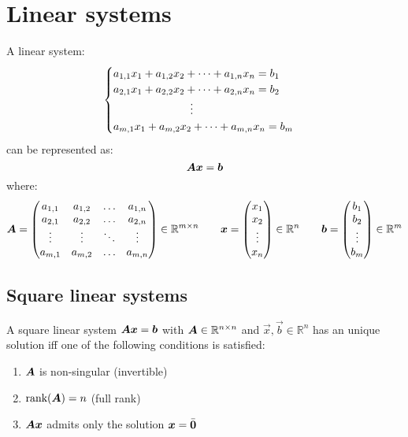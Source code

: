 \chapter{Linear systems}

A linear system:
\begin{equation*}
    \begin{cases}
        a_{1,1}x_1 + a_{1,2}x_2 + \dots + a_{1,n}x_n = b_1\\
        a_{2,1}x_1 + a_{2,2}x_2 + \dots + a_{2,n}x_n = b_2\\
        \hspace*{7em} \vdots \\
        a_{m,1}x_1 + a_{m,2}x_2 + \dots + a_{m,n}x_n = b_m\\
    \end{cases}
\end{equation*}
can be represented as:
\[ {\bm{A}}{\bm{x}} = {\bm{b}} \]
where:
\[
    {\bm{A}} = 
    \begin{pmatrix}
        a_{1,1} & a_{1, 2} & \hdots & a_{1,n} \\
        a_{2,1} & a_{2, 2} & \hdots & a_{2,n} \\
        \vdots  & \vdots   & \ddots & \vdots  \\
        a_{m,1} & a_{m, 2} & \hdots & a_{m,n}
    \end{pmatrix} \in \mathbb{R}^{m \times n}
    \hspace*{2em}
    {\bm{x}} = 
    \begin{pmatrix}
        x_1 \\
        x_2 \\ 
        \vdots \\
        x_n
    \end{pmatrix} \in \mathbb{R}^n
    \hspace*{2em}
    {\bm{b}} = 
    \begin{pmatrix}
        b_1 \\
        b_2 \\ 
        \vdots \\
        b_m
    \end{pmatrix} \in \mathbb{R}^m
\]
    


\section{Square linear systems}
A square linear system ${\bm{A}}{\bm{x}} = {\bm{b}}$ with ${\bm{A}} \in \mathbb{R}^{n \times n}$ and $\vec{x}, \vec{b} \in \mathbb{R}^n$
has an unique solution iff one of the following conditions is satisfied:
\begin{enumerate}
    \item ${\bm{A}}$ is non-singular (invertible)
    \item $\text{rank}({\bm{A}}) = n$ (full rank)
    \item ${\bm{A}}{\bm{x}}$ admits only the solution ${\bm{x}} = \bar{{\bm{0}}}$
\end{enumerate}

